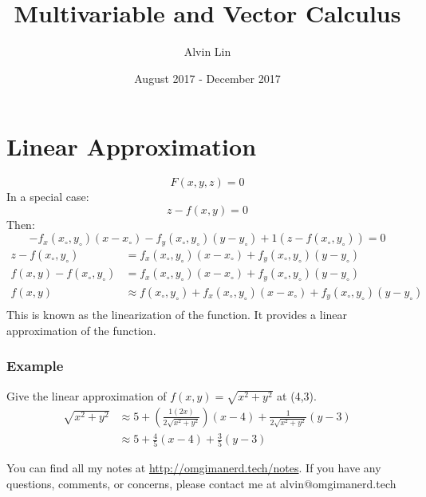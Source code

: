 \documentclass{math}
\title{Multivariable and Vector Calculus}
\author{Alvin Lin}
\date{August 2017 - December 2017}
\begin{document}
\maketitle

\section*{Linear Approximation}
\[ F(x,y,z) = 0 \]
In a special case:
\[ z-f(x,y) = 0 \]
Then:
\[ -f_x(x_{\circ},y_{\circ})(x-x_{\circ})-f_y(x_{\circ},y_{\circ})(y-y_{\circ})+
  1(z-f(x_{\circ},y_{\circ})) = 0 \]
\begin{align*}
  z-f(x_{\circ},y_{\circ}) &= f_x(x_{\circ},y_{\circ})(x-x_{\circ})+
    f_y(x_{\circ},y_{\circ})(y-y_{\circ}) \\
  f(x,y)-f(x_{\circ},y_{\circ}) &= f_x(x_{\circ},y_{\circ})(x-x_{\circ})+
    f_y(x_{\circ},y_{\circ})(y-y_{\circ}) \\
  f(x,y) &\approx f(x_{\circ},y_{\circ})+f_x(x_{\circ},y_{\circ})(x-x_{\circ})+
    f_y(x_{\circ},y_{\circ})(y-y_{\circ}) \\
\end{align*}
This is known as the linearization of the function. It provides a linear
approximation of the function.

\subsubsection*{Example}
Give the linear approximation of \( f(x,y) = \sqrt{x^2+y^2} \) at (4,3).
\begin{align*}
  \sqrt{x^2+y^2} &\approx 5+(\frac{1(2x)}{2\sqrt{x^2+y^2}})(x-4)+
    \frac{1}{2\sqrt{x^2+y^2}}(y-3) \\
  &\approx 5+\frac{4}{5}(x-4)+\frac{3}{5}(y-3)
\end{align*}

\begin{center}
  You can find all my notes at \url{http://omgimanerd.tech/notes}. If you have
  any questions, comments, or concerns, please contact me at
  alvin@omgimanerd.tech
\end{center}
\end{document}
